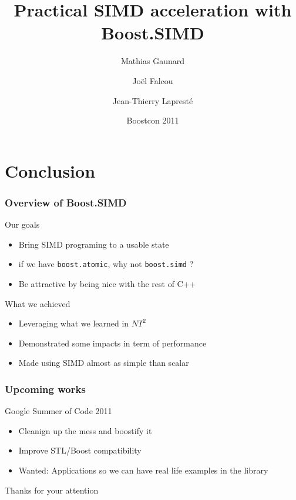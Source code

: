 \documentclass{beamer}
\title{Practical SIMD acceleration with Boost.SIMD}
\author{Mathias Gaunard \and Joël Falcou \and Jean-Thierry Lapresté}
\institute[MetaScale]{MetaScale}
\date[BOOST 2011]{Boostcon 2011}
\begin{document}


\begin{frame}
\titlepage
\end{frame}





\section{Conclusion}
\frame
{
  \frametitle{Overview of Boost.SIMD}
  \begin{block}{Our goals}
   \begin{itemize}
\footnotesize
\item Bring SIMD programing to a usable state
\item if we have \texttt{boost.atomic}, why not \texttt{boost.simd} ?
\item Be attractive by being nice with the rest of C++
\end{itemize}
  \end{block}{}

  \begin{block}{What we achieved}
  \begin{itemize}
  \footnotesize
  \item Leveraging what we learned in $NT^2$
  \item Demonstrated some impacts in term of performance
  \item Made using SIMD almost as simple than scalar
  \end{itemize}
  \end{block}{}
}

\frame
{
  \frametitle{Upcoming works}
  \begin{block}{Google Summer of Code 2011}
  \begin{itemize}
  \footnotesize
  \item Cleanign up the mess and boostify it
  \item Improve STL/Boost compatibility
  \item \alert{Wanted: Applications so we can have real life examples in the library}
  \end{itemize}
  \end{block}{}
}

\frame
{
\begin{center}\Huge Thanks for your attention\end{center}
}
\end{document}
